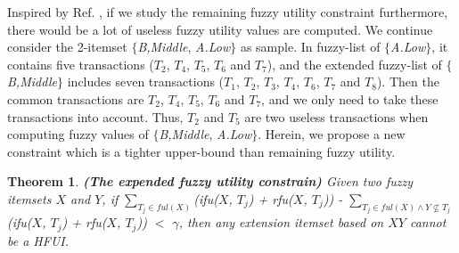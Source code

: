 \documentclass[journal]{IEEEtran}
\newtheorem{theorem}{Theorem}   %
\begin{document}
Inspired by Ref. \cite{krishnamoorthy2015pruning}, if we study the remaining fuzzy utility constraint furthermore, there would be a lot of useless fuzzy utility values are computed. We continue consider the 2-itemset $\{$\textit{B,Middle}, \textit{A.Low}$\}$ as sample. In fuzzy-list of $\{$\textit{A.Low}$\}$, it contains five transactions ($T_2$, $T_4$, $T_5$, $T_6$ and $T_7$), and the extended fuzzy-list of $\{$\textit{B,Middle}$\}$ includes seven transactions ($T_1$, $T_2$, $T_3$, $T_4$, $T_6$, $T_7$ and $T_8$). Then the common transactions are $T_2$, $T_4$, $T_5$, $T_6$ and $T_7$, and we only need to take these transactions into account. Thus, $T_2$ and $T_5$ are two useless transactions when computing fuzzy values of $\{$\textit{B,Middle}, \textit{A.Low}$\}$. Herein, we propose a new constraint which is a tighter upper-bound than remaining fuzzy utility.

\begin{theorem}
	\textbf{(The expended fuzzy utility constrain)}
	\label{theo:sumExU}
	\rm Given two fuzzy itemsets $X$ and $Y$, if $\sum_{T_j \in ful(X)}$(\textit{ifu}($X$, $T_j$) + \textit{rfu}($X$, $T_j$)) - $\sum_{T_j \in ful(X) \land Y \not\subseteq T_j}$(\textit{ifu}($X$, $T_j$) + \textit{rfu}($X$, $T_j$)) $<$ $\gamma$, then any extension itemset based on $XY$ cannot be a HFUI.
\end{theorem}
\end{document}

